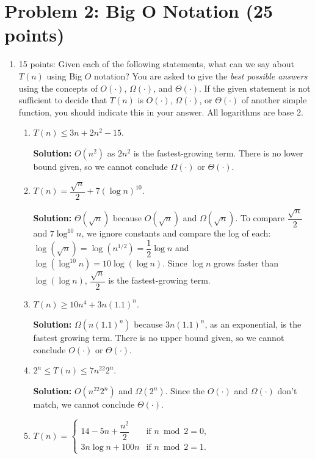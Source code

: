 \documentclass[12pt]{article}
\begin{document}
\section*{Problem 2: Big O Notation (25 points)}
\begin{enumerate}
\item[(a)] 15 points: Given each of the following statements, what can we say about $T(n)$ using Big $O$ notation? You are asked to give the \emph{best possible answers} using the concepts of $O(\cdot)$, $\Omega(\cdot)$, and $\Theta(\cdot)$. If the given statement is not sufficient to decide that $T(n)$ is $O(\cdot)$, $\Omega(\cdot)$, or $\Theta(\cdot)$ of another simple function, you should indicate this in your answer. All logarithms are base 2.
\begin{enumerate}
\item $T(n) \leq 3n + 2n^2 - 15$.

\textbf{Solution:} $O(n^2)$ as $2n^2$ is the fastest-growing term. There is no lower bound given, so we cannot conclude $\Omega(\cdot)$ or $\Theta(\cdot)$.

\item $T(n)=\dfrac{\sqrt{n}}{2}+7(\log n)^{10}$.

\textbf{Solution:} $\Theta(\sqrt{n})$ because $O(\sqrt{n})$ and $\Omega(\sqrt{n})$. To compare $\dfrac{\sqrt{n}}{2}$ and $7\log^{10} n$, we ignore constants and compare the log of each: $\log(\sqrt{n})=\log(n^{1/2})=\dfrac{1}{2}\log n$ and $\log(\log^{10} n)=10\log(\log n)$. Since $\log n$ grows faster than $\log(\log n)$, $\dfrac{\sqrt{n}}{2}$ is the fastest-growing term.

\item $T(n) \geq 10n^4 + 3n(1.1)^n$.

\textbf{Solution:} $\Omega(n(1.1)^n)$ because $3n(1.1)^n$, as an exponential, is the fastest growing term. There is no upper bound given, so we cannot conclude $O(\cdot)$ or $\Theta(\cdot)$.

\item $2^n \leq T(n) \leq 7n^{22}2^n$.

\textbf{Solution:} $O(n^{22}2^n)$ and $\Omega(2^n)$. Since the $O(\cdot)$ and $\Omega(\cdot)$ don't match, we cannot conclude $\Theta(\cdot)$.

\item $T(n)=\begin{cases}
14-5n+\dfrac{n^2}{2} & \text{if } n \bmod 2=0,\\
3n\log n+100n & \text{if } n \bmod 2=1.
\end{cases}$


\end{enumerate}
\end{enumerate}
\end{document}

